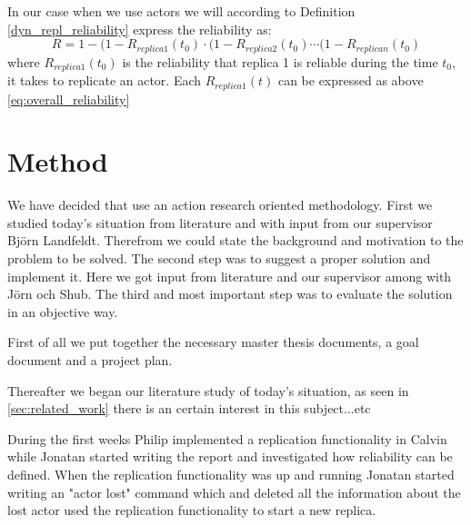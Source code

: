 \documentclass{cslthse-msc}
\begin{document}
In our case when we use actors we will according to Definition \ref{dyn_repl_reliability} express the reliability as:
\begin{equation} \label{eq:replica_reliability}
R = 1 - (1 - R_{replica 1}(t_0) \cdot (1 - R_{replica 2}(t_0) \cdots (1 - R_{replica n}(t_0)
\end{equation}
where $R_{replica 1}(t_0)$ is the reliability that replica 1 is reliable during the time $t_0$, it takes to replicate an actor. Each $R_{replica 1}(t)$ can be expressed as above \ref{eq:overall_reliability}


\section{Method} \label{sec:method}
We have decided that use an action research oriented methodology. First we studied today's situation from literature and with input from our supervisor Björn Landfeldt. Therefrom we could state the background and motivation to the problem to be solved.
The second step was to suggest a proper solution and implement it. Here we got input from literature and our supervisor among with Jörn och Shub. The third and most important step was to evaluate the solution in an objective way. %

First of all we put together the necessary master thesis documents, a goal document and a project plan. 

Thereafter we began our literature study of today's situation, as seen in \ref{sec:related_work} there is an certain interest in this subject...etc

During the first weeks Philip implemented a replication functionality in Calvin while Jonatan started writing the report and investigated how reliability can be defined. When the replication functionality was up and running Jonatan started writing an "actor lost" command which and deleted all the information about the lost actor used the replication functionality to start a new replica.
\end{document}
